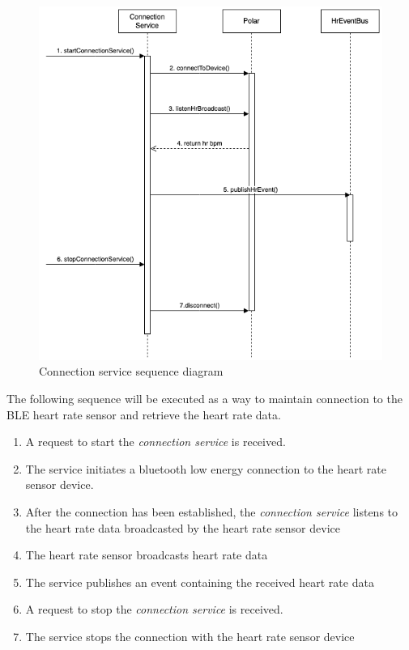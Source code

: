 \begin{figure}[H]
    \centering
    \includegraphics[width=1\textwidth]{diagrams/connection-service-onStart.drawio.png}
    \caption{Connection service sequence diagram}
    \label{fig:connection_diagram}
\end{figure}

The following sequence will be executed as a way to maintain connection to the BLE heart rate sensor and retrieve the heart rate data.
\begin{enumerate}
    \item A request to start the \emph{connection service} is received.
    \item The service initiates a bluetooth low energy connection to the heart rate sensor device.
    \item After the connection has been established, the \emph{connection service} listens to the heart rate data broadcasted by the heart rate sensor device
    \item The heart rate sensor broadcasts heart rate data
    \item The service publishes an event containing the received heart rate data
    \item A request to stop the \emph{connection service} is received.
    \item The service stops the connection with the heart rate sensor device
\end{enumerate}


